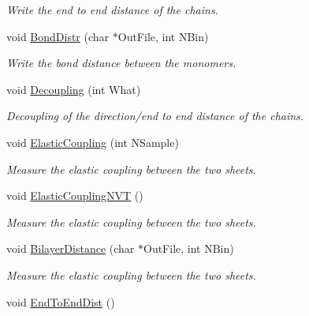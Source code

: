 \begin{DoxyCompactItemize}
\begin{DoxyCompactList}\small\item\em \-Write the end to end distance of the chains. \end{DoxyCompactList}\item 
\hypertarget{classElPoly_af5a6c502bd65553e3f5e98577081ec66}{void \hyperlink{classElPoly_af5a6c502bd65553e3f5e98577081ec66}{\-Bond\-Distr} (char $\ast$\-Out\-File, int \-N\-Bin)}\label{classElPoly_af5a6c502bd65553e3f5e98577081ec66}

\begin{DoxyCompactList}\small\item\em \-Write the bond distance between the monomers. \end{DoxyCompactList}\item 
\hypertarget{classElPoly_a44e20767e332d941b94906f1a8e60e24}{void \hyperlink{classElPoly_a44e20767e332d941b94906f1a8e60e24}{\-Decoupling} (int \-What)}\label{classElPoly_a44e20767e332d941b94906f1a8e60e24}

\begin{DoxyCompactList}\small\item\em \-Decoupling of the direction/end to end distance of the chains. \end{DoxyCompactList}\item 
void \hyperlink{classElPoly_a48968ddc44376e55852e9720b3827ebe}{\-Elastic\-Coupling} (int \-N\-Sample)
\begin{DoxyCompactList}\small\item\em \-Measure the elastic coupling between the two sheets. \end{DoxyCompactList}\item 
void \hyperlink{classElPoly_ab88192e9e4e0f11b68ad828d73ff8957}{\-Elastic\-Coupling\-N\-V\-T} ()
\begin{DoxyCompactList}\small\item\em \-Measure the elastic coupling between the two sheets. \end{DoxyCompactList}\item 
\hypertarget{classElPoly_a6f1477b110e5ee0e7e027466dac51b69}{void \hyperlink{classElPoly_a6f1477b110e5ee0e7e027466dac51b69}{\-Bilayer\-Distance} (char $\ast$\-Out\-File, int \-N\-Bin)}\label{classElPoly_a6f1477b110e5ee0e7e027466dac51b69}

\begin{DoxyCompactList}\small\item\em \-Measure the elastic coupling between the two sheets. \end{DoxyCompactList}\item 
\hypertarget{classElPoly_a9152ea7044fdfac4a1def898c1c21a9d}{void \hyperlink{classElPoly_a9152ea7044fdfac4a1def898c1c21a9d}{\-End\-To\-End\-Dist} ()}\label{classElPoly_a9152ea7044fdfac4a1def898c1c21a9d}


\end{DoxyCompactItemize}

